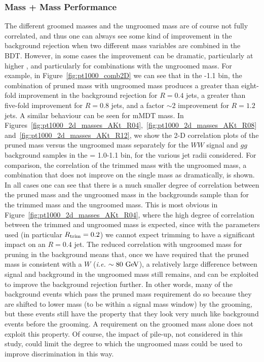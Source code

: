 \subsubsection{Mass + Mass Performance}

The different groomed masses and the ungroomed mass are of course not
fully correlated, and thus one can always see some kind of improvement
in the background rejection when two different mass variables are combined
in the BDT. However, in some cases the improvement can be dramatic,
particularly at higher \pt, and particularly for combinations with the
ungroomed mass. For example, in Figure~\ref{fig:pt1000_comb2D} we can
see that in the -1.1 \TeV bin, the combination of pruned mass with
ungroomed mass produces a greater than eight-fold improvement in the
background rejection for $R=0.4$ jets, a greater than five-fold
improvement for $R=0.8$ jets, and a factor $\sim 2$ improvement for
$R=1.2$ jets. A similar behaviour can be seen for mMDT mass. 
In Figures~\ref{fig:pt1000_2d_masses_AKt_R04},~\ref{fig:pt1000_2d_masses_AKt_R08}
and~\ref{fig:pt1000_2d_masses_AKt_R12}, we show the 2-D correlation plots of the pruned mass versus the
ungroomed mass separately for the $WW$ signal and $gg$ background
samples in the \pt = 1.0-1.1 \TeV bin, for the various jet radii
considered. For comparison, the correlation of the trimmed mass with
the ungroomed mass, a combination that does not improve on the single
mass as dramatically, is shown. In all cases one can see that there is
a much smaller degree of correlation between the pruned mass and the
ungroomed mass in the backgrounds sample than for the trimmed mass and the ungroomed mass. This
is most obvious in Figure~\ref{fig:pt1000_2d_masses_AKt_R04}, where
the high degree of correlation between the trimmed and ungroomed mass
is expected, since with the parameters used (in particular
$R_{\rm trim} = 0.2$) we cannot expect trimming to have a significant
impact on an $R=0.4$ jet. The reduced correlation with ungroomed mass
for pruning in the background means that, once we have required that the
pruned mass is consistent with a $W$ (\emph{i.e.} $\sim 80 \GeV$), a relatively large difference
between signal and background in the ungroomed mass still remains, and
can be exploited to improve the background rejection further. In other
words, many of the background events which pass the pruned mass
requirement do so because they are shifted to lower mass (to be within
a signal mass window) by the grooming, but these events still have the
property that they look very much like background events before the
grooming. A  requirement on the groomed mass alone does not
exploit this property. Of course, the impact of pile-up, not considered in this
study, could limit the degree to which the ungroomed
mass could be used to improve discrimination in this way. 

